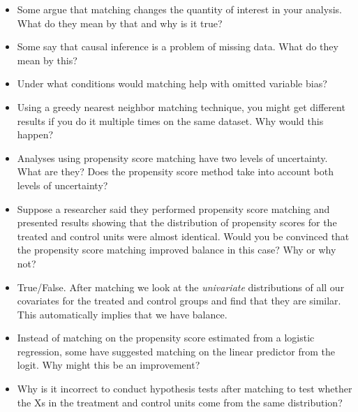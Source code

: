 \documentclass[11pt]{article}
\begin{document}
\begin{itemize}
\item Some argue that matching changes the quantity of interest in your analysis.  What do they mean by that and why is it true?

\item Some say that causal inference is a problem of missing data.  What do they mean by this?

\item Under what conditions would matching help with omitted variable bias?

\item Using a greedy nearest neighbor matching technique, you might get different results if you do it multiple times on the same dataset.  Why would this happen?

\item Analyses using propensity score matching have two levels of uncertainty.  What are they?  Does the propensity score method take into account both levels of uncertainty?

\item Suppose a researcher said they performed propensity score matching and presented results showing that the distribution of propensity scores for the treated and control units were almost identical.  Would you be convinced that the propensity score matching improved balance in this case?  Why or why not?

\item True/False.  After matching we look at the \textit{univariate} distributions of all our covariates for the treated and control groups and find that they are similar.  This automatically implies that we have balance.

\item Instead of matching on the propensity score estimated from a logistic regression, some have suggested matching on the linear predictor from the logit.  Why might this be an improvement?

\item Why is it incorrect to conduct hypothesis tests after matching to test whether the Xs in the treatment and control units come from the same distribution?
\end{itemize}
\end{document}
